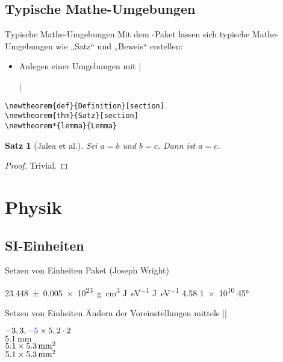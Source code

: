 \documentclass[
	vorläufig=false,
	datum=2022-11-02,
	titel={Mathematiksatz II},
	web=true,
	max,
	aspectratio=1610,
]{../tex/latexkurs-slides}
\begin{document}
\subsection{Typische Mathe-Umgebungen}
\begin{frame}[fragile]{Typische Mathe-Umgebungen}%
Mit dem \AmS-Paket  lassen sich typische Mathe-Umgebungen wie „Satz“ und „Beweis“ erstellen:
\begin{itemize}
\item Anlegen einer Umgebungen mit |\newtheorem{|\meta{Kürzel}|}{||}[|\meta{Nummerierungsebene}|]|
\end{itemize}
\begin{lstlisting}
\newtheorem{def}{Definition}[section]
\newtheorem{thm}{Satz}[section]
\newtheorem*{lemma}{Lemma}
\end{lstlisting}
\newtheorem{thm}{Satz}[section]
\begin{LTXexample}
\begin{thm}[Jalea et al.]
  Sei \(a=b\) und \(b=c\). Dann ist \(a=c\).
\end{thm}
\begin{proof}
  Trivial.
\end{proof}
\end{LTXexample}
\end{frame}


\section{Physik}
\subsection{SI-Einheiten}
\begin{frame}[fragile]{Setzen von Einheiten}
Paket  (Joseph Wright)
\begin{LTXexample}[preset={\obeylines},pos=r]
\SI[separate-uncertainty]{23.448(5)e23}{g.cm^3}
\si[per-mode=fraction]{\joule\per\eV}
\si{\joule\per\eV}
\num[mode=text]{4.58}
\num[exponent-product=\cdot]{1e10}
\ang[]{45}
\end{LTXexample}
\end{frame}

\begin{frame}[fragile]{Setzen von Einheiten}
Ändern der Voreinstellungen mittels |\sisetup|
\begin{LTXexample}
\(\num{-3}, \num{3},
\numproduct[negative-color=blue]{-5x5},
\num{2}\cdot\num 2\)\\

\def\a{5.1}
\(\SI{\a}{\milli\meter}\)\\
\(\numproduct{\a x 5.3}\,\si{\square\milli\meter}\)\\
\(\numproduct{\a x 5.3}\,\si{\milli\meter
\squared}\)
\end{LTXexample}
\end{frame}
\end{document}
